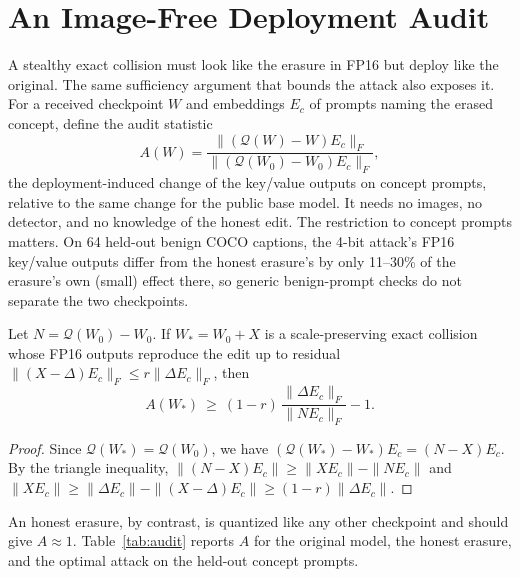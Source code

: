 \section{An Image-Free Deployment Audit}
\label{sec:audit}
A stealthy exact collision must look like the erasure in FP16 but deploy like the
original. The same sufficiency argument that bounds the attack also exposes it. For a
received checkpoint $W$ and embeddings $E_c$ of prompts naming the erased concept,
define the audit statistic
\begin{equation}
 A(W)=\frac{\|(\mathcal{Q}(W)-W)E_c\|_F}{\|(\mathcal{Q}(W_0)-W_0)E_c\|_F},
 \label{eq:audit}
\end{equation}
the deployment-induced change of the key/value outputs on concept prompts, relative
to the same change for the public base model. It needs no images, no detector, and
no knowledge of the honest edit. The restriction to concept prompts matters. On 64
held-out benign COCO captions, the 4-bit attack's FP16 key/value outputs differ from
the honest erasure's by only 11--30\% of the erasure's own (small) effect there, so
generic benign-prompt checks do not separate the two checkpoints.

\begin{proposition}
\label{prop:audit}
Let $N=\mathcal{Q}(W_0)-W_0$. If $W_*=W_0+X$ is a scale-preserving exact collision
whose FP16 outputs reproduce the edit up to residual
$\|(X-\Delta)E_c\|_F\le r\|\Delta E_c\|_F$, then
\begin{equation}
 A(W_*)\ \ge\ (1-r)\,\frac{\|\Delta E_c\|_F}{\|NE_c\|_F}-1.
\end{equation}
\end{proposition}
\begin{proof}
Since $\mathcal{Q}(W_*)=\mathcal{Q}(W_0)$, we have $(\mathcal{Q}(W_*)-W_*)E_c=(N-X)E_c$.
By the triangle inequality, $\|(N-X)E_c\|\ge\|XE_c\|-\|NE_c\|$ and
$\|XE_c\|\ge\|\Delta E_c\|-\|(X-\Delta)E_c\|\ge(1-r)\|\Delta E_c\|$.
\end{proof}

An honest erasure, by contrast, is quantized like any other checkpoint and should give
$A\approx1$. Table~\ref{tab:audit} reports $A$ for the original model, the honest
erasure, and the optimal attack on the held-out concept prompts.

\begin{table}[t]
\centering
\caption{Image-free audit statistic $A$ (Eq.~\ref{eq:audit}) on held-out concept
prompts. The denominator uses the public base model. The last column is the
lower bound of Proposition~\ref{prop:audit} at the attack's measured residual.}
\label{tab:audit}
\end{table}

